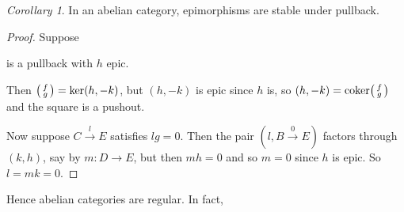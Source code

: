 \documentclass[a4paper]{article}
\theoremstyle{definition}
\theoremstyle{remark}
\theoremstyle{default}
\newtheorem{corollary}[definition]{Corollary}
\numberwithin{definition}{section}
\DeclareMathOperator{\coker}{coker}
\begin{document}
\begin{corollary}
	In an abelian category, epimorphisms are stable under pullback.
\end{corollary}
\begin{proof}
	Suppose
	is a pullback with $h$ epic.
	
	Then $\begin{psmallmatrix}f\\g\end{psmallmatrix} = \ker(h, -k)$,
	but $(h, -k)$ is epic since $h$ is,
	so $(h, -k) = \coker \begin{psmallmatrix}f\\g\end{psmallmatrix}$ and the square is a pushout.

	Now suppose $C \overset{l}{\to} E$ satisfies $lg=0$.
	Then the pair $(l, B \overset{0}{\to} E)$ factors through $(k, h)$,
	say by $m: D \to E$,
	but then $mh=0$ and so $m=0$ since $h$ is epic.
	So $l=mk=0$.
\end{proof}


Hence abelian categories are regular. In fact,
\end{document}
